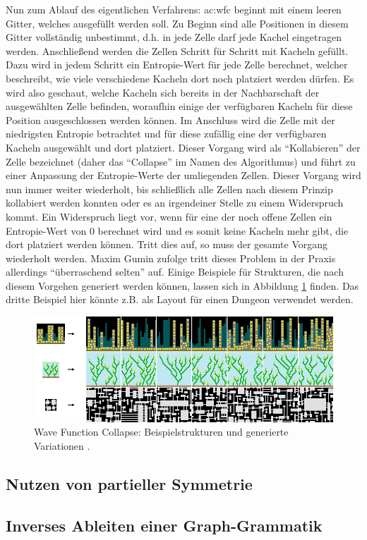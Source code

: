 Nun zum Ablauf des eigentlichen Verfahrens: \gls{ac:wfc} beginnt mit einem leeren Gitter, welches ausgefüllt werden soll. Zu Beginn sind alle Positionen
in diesem Gitter vollständig unbestimmt, d.h. in jede Zelle darf jede Kachel eingetragen werden. Anschließend werden die Zellen Schritt für Schritt mit
Kacheln gefüllt. Dazu wird in jedem Schritt ein Entropie-Wert für jede Zelle berechnet, welcher beschreibt, wie viele verschiedene Kacheln dort noch
platziert werden dürfen. Es wird also geschaut, welche Kacheln sich bereits in der Nachbarschaft der ausgewählten Zelle befinden, woraufhin einige der
verfügbaren Kacheln für diese Position ausgeschlossen werden können. Im Anschluss wird die Zelle mit der niedrigsten Entropie betrachtet und für diese
zufällig eine der verfügbaren Kacheln ausgewählt und dort platziert. Dieser Vorgang wird als ``Kollabieren'' der Zelle bezeichnet (daher das ``Collapse''
im Namen des Algorithmus) und führt zu einer Anpassung der Entropie-Werte der umliegenden Zellen. Dieser Vorgang wird nun immer weiter wiederholt, bis
schließlich alle Zellen nach diesem Prinzip kollabiert werden konnten oder es an irgendeiner Stelle zu einem Widerspruch kommt. Ein Widerspruch liegt
vor, wenn für eine der noch offene Zellen ein Entropie-Wert von \(0\) berechnet wird und es somit keine Kacheln mehr gibt, die dort platziert werden
können. Tritt dies auf, so muss der gesamte Vorgang wiederholt werden. Maxim Gumin zufolge tritt dieses Problem in der Praxis allerdings ``überraschend
selten'' auf. \cite{45_gumin} Einige Beispiele für Strukturen, die nach diesem Vorgehen generiert werden können, lassen sich in Abbildung \ref{fig:wfc}
finden. Das dritte Beispiel hier könnte z.B. als Layout für einen Dungeon verwendet werden.

\begin{figure}[t]
    \centering
    \includegraphics[width=\imgWidth]{images/wfc.png}
    \caption{Wave Function Collapse: Beispielstrukturen und generierte Variationen \cite{45_gumin}.}
    \label{fig:wfc}
\end{figure}

\subsection{Nutzen von partieller Symmetrie}

\subsection{Inverses Ableiten einer Graph-Grammatik}
